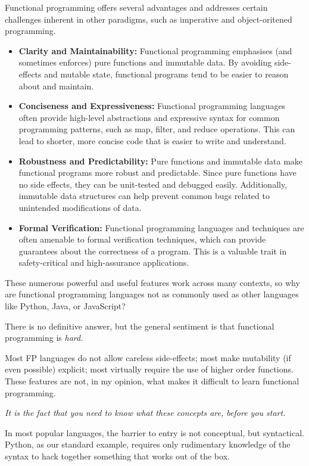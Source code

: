 \documentclass{l4proj}
\begin{document}
Functional programming offers several advantages and addresses certain challenges inherent in other paradigms, such as imperative and object-oritened programming. 

\begin{itemize}
    \item \textbf{Clarity and Maintainability:} Functional programming emphasises (and sometimes enforces) pure functions and immutable data.
    By avoiding side-effects and mutable state, functional programs tend to be easier to reason about and maintain.
    \item \textbf{Conciseness and Expressiveness:} Functional programming languages often provide high-level abstractions and expressive syntax for common programming patterns, such as map, filter, and reduce operations.
    This can lead to shorter, more concise code that is easier to write and understand.
    \item \textbf{Robustness and Predictability:} Pure functions and immutable data make functional programs more robust and predictable.
    Since pure functions have no side effects, they can be unit-tested and debugged easily.
    Additionally, immutable data structures can help prevent common bugs related to unintended modifications of data.
    \item \textbf{Formal Verification:} Functional programming languages and techniques are often amenable to formal verification techniques, which can provide guarantees about the correctness of a program.
    This is a valuable trait in safety-critical and high-assurance applications.
\end{itemize}

These numerous powerful and useful features work across many contexts, so why are functional programming languages not as commonly used as other languages like Python, Java, or JavaScript?

There is no definitive answer, but the general sentiment is that functional programming is \emph{hard.}

Most FP languages do not allow careless side-effects; most make mutability (if even possible) explicit; most virtually require the use of higher order functions. 
These features are not, in my opinion, what makes it difficult to learn functional programming. 

\emph{It is the fact that you need to know what these concepts are, before you start.}

In most popular languages, the barrier to entry is not conceptual, but syntactical.
Python, as our standard example, requires only rudimentary knowledge of the syntax to hack together something that works out of the box.
\end{document}
